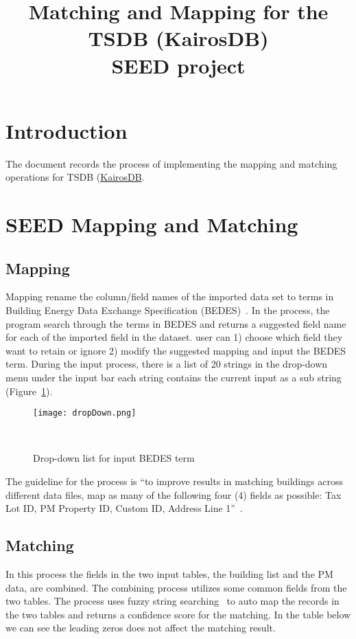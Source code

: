 \documentclass[12pt]{article}
\newcommand{\fref}[1]{Figure~\ref{#1}}
\begin{document}
\title{Matching and Mapping for the TSDB (KairosDB)\\
       \large SEED project}
\maketitle
\tableofcontents
\newpage
\section{Introduction}\label{sec:intro}
The document records the process of implementing the mapping and
matching operations for TSDB
(\href{https://code.google.com/p/kairosdb/}{KairosDB}.

\section{SEED Mapping and Matching}\label{sec:def}
\subsection{Mapping}
Mapping rename the column/field names of the imported data set to
terms in Building Energy Data Exchange Specification
(BEDES)~\cite{BEDES2015}. In the process, the program search through
the terms in BEDES and returns a suggested field name for each of the
imported field in the dataset. user can 1) choose which field they
want to retain or ignore 2) modify the suggested mapping and input the
BEDES term. During the input process, there is a list of 20 strings in
the drop-down menu under the input bar each string contains the
current input as a sub string (\fref{fig:dropDown}).

\begin{figure}[h!]
  \centering
  \texttt{[image: dropDown.png]}
  \caption{Drop-down list for input BEDES term}~\cite{SEEDWebpage2015}
  \label{fig:dropDown}
\end{figure}

The guideline for the process is ``to improve results in matching
buildings across different data files, map as many of the following
four (4) fields as possible: Tax Lot ID, PM Property ID, Custom ID,
Address Line 1''~\cite{SEEDWebpage2015}.

\subsection{Matching} 

In this process the fields in the two input tables, the building list
and the PM data, are combined. The combining process utilizes some
common fields from the two tables. The process uses fuzzy string
searching~\cite{SEEDTutorial2015, approxStringMatchWiki} to auto map
the records in the two tables and returns a confidence score for the
matching. In the table below we can see the leading zeros does not
affect the matching result.
\end{document}
